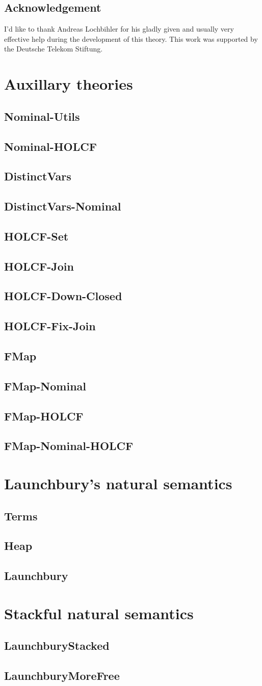 \documentclass[11pt,a4paper,parskip=half]{scrartcl}
\begin{document}
\subsection{Acknowledgement}

I’d like to thank Andreas Lochbihler for his gladly given and usually very effective help during the development of this theory. This work was supported by the Deutsche Telekom Stiftung.

\clearpage
\newcommand{\theory}[1]{\subsection{#1}\label{sec_#1}}

\section{Auxillary theories}

\label{ch_aux}

\theory{Nominal-Utils}


\theory{Nominal-HOLCF}

\theory{DistinctVars}

\theory{DistinctVars-Nominal}

\theory{HOLCF-Set}

\theory{HOLCF-Join}

\theory{HOLCF-Down-Closed}

\theory{HOLCF-Fix-Join}

\theory{FMap}

\theory{FMap-Nominal}

\theory{FMap-HOLCF}

\theory{FMap-Nominal-HOLCF}


\clearpage
\section{Launchbury's natural semantics}
\label{ch_natsem}

\theory{Terms}
\theory{Heap}

\theory{Launchbury}

\clearpage
\section{Stackful natural semantics}
\label{ch_natsemstack}

\theory{LaunchburyStacked}

\theory{LaunchburyMoreFree}
\end{document}

